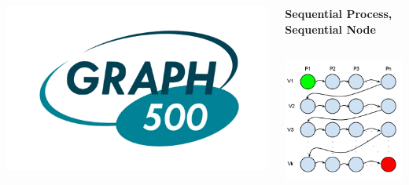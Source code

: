\documentclass[final]{beamer} %
\begin{document}
\begin{frame}[t]
\begin{columns}[t]
\begin{column}{0.60\paperwidth}
\begin{columns}[t,totalwidth=0.60\paperwidth]
\begin{column}{0.28\paperwidth}
\begin{columns}[t,totalwidth=0.28\paperwidth]
\begin{column}{0.12\paperwidth}
								\begin{center} \includegraphics[width=0.12\paperwidth]{img/logo_graph500} \end{center}
							\end{column}
						\end{columns}
					\end{column}
					\begin{column}{0.28\paperwidth}
						\begin{center} \bf{Sequential Process, Sequential Node} \end{center}
						\begin{columns}[t,totalwidth=0.28\paperwidth]
							\begin{column}{0.12\paperwidth}
								\begin{center} \includegraphics[width=0.12\paperwidth]{img/linked_list/seq_proc_seq_node} \end{center}

\end{column}
\end{columns}
\end{column}
\end{columns}
\end{column}
\end{columns}
\end{frame}
\end{document}
